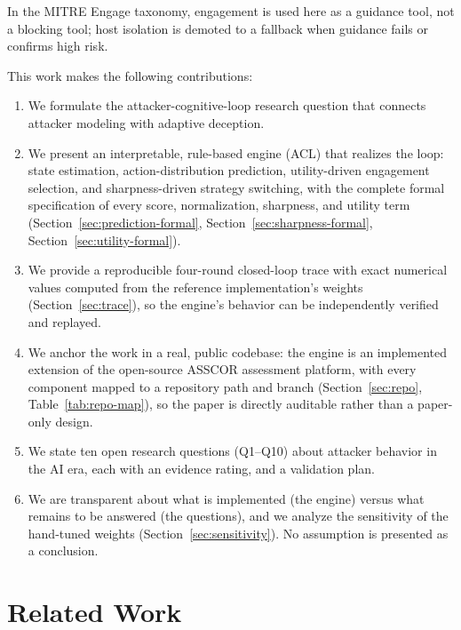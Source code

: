 \documentclass[preprints,article,accept,oneauthor]{Definitions/mdpi}
\begin{document}
In the MITRE Engage taxonomy, engagement is used here as a guidance tool,
not a blocking tool; host isolation is demoted to a fallback when guidance
fails or confirms high risk.

This work makes the following contributions:
\begin{enumerate}
\item We formulate the attacker-cognitive-loop research question that
      connects attacker modeling with adaptive deception.
\item We present an interpretable, rule-based engine (ACL) that realizes the
      loop: state estimation, action-distribution prediction, utility-driven
      engagement selection, and sharpness-driven strategy switching, with
      the complete formal specification of every score, normalization,
      sharpness, and utility term (Section~\ref{sec:prediction-formal},
      Section~\ref{sec:sharpness-formal}, Section~\ref{sec:utility-formal}).
\item We provide a reproducible four-round closed-loop trace with exact
      numerical values computed from the reference implementation's weights
      (Section~\ref{sec:trace}), so the engine's behavior can be independently
      verified and replayed.
\item We anchor the work in a real, public codebase: the engine is an
      implemented extension of the open-source ASSCOR assessment platform,
      with every component mapped to a repository path and branch
      (Section~\ref{sec:repo}, Table~\ref{tab:repo-map}), so the paper is directly
      auditable rather than a paper-only design.
\item We state ten open research questions (Q1--Q10) about attacker
      behavior in the AI era, each with an evidence rating, and a
      validation plan.
\item We are transparent about what is implemented (the engine) versus what
      remains to be answered (the questions), and we analyze the
      sensitivity of the hand-tuned weights (Section~\ref{sec:sensitivity}). No
      assumption is presented as a conclusion.
\end{enumerate}

\section{Related Work}
\label{sec:related}
\end{document}

